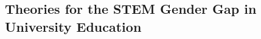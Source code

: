 \documentclass[12pt]{article}
\begin{document}
\subsection{Theories for the STEM Gender Gap in University Education}
\label{theories}


\newpage


\newpage
\listoffigures
\listoftables
\end{document}

